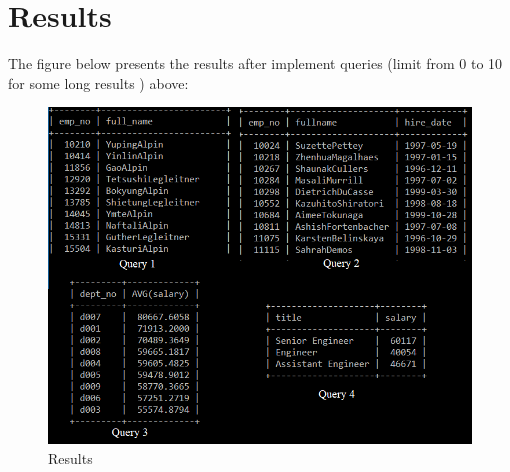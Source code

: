\documentclass{article}
\begin{document}
\section*{Results}

The figure below presents the results after implement queries (limit from 0 to 10 for some long results
) above:\\
\begin{figure}
\includegraphics[scale = 0.9]{result.PNG}
\caption{Results}
\end{figure}
\end{document}
